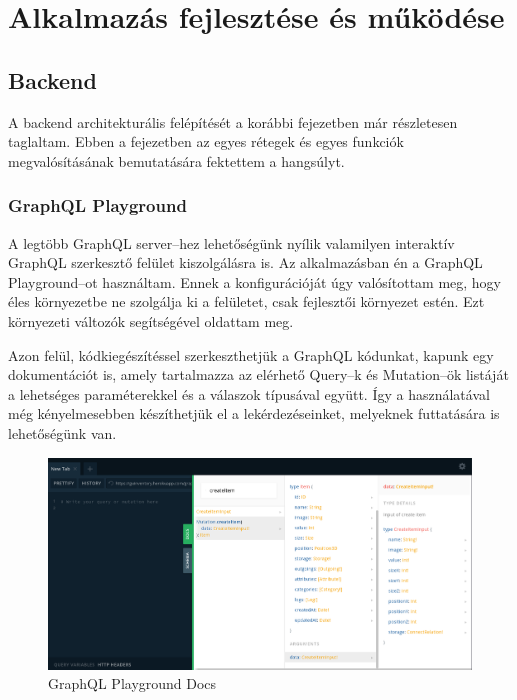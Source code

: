 \chapter{Alkalmazás fejlesztése és működése}

\section{Backend}
A backend architekturális felépítését a korábbi fejezetben már részletesen taglaltam.  
Ebben a fejezetben az egyes rétegek és egyes funkciók megvalósításának bemutatására fektettem a hangsúlyt.

\subsection{GraphQL Playground}
A legtöbb GraphQL server–hez lehetőségünk nyílik valamilyen interaktív GraphQL szerkesztő felület kiszolgálásra is.
Az alkalmazásban én a GraphQL Playground–ot használtam. Ennek a konfigurációját úgy valósítottam meg, hogy éles környezetbe ne szolgálja ki a felületet, csak fejlesztői környezet estén.
Ezt környezeti változók segítségével oldattam meg.

Azon felül, kódkiegészítéssel szerkeszthetjük a GraphQL kódunkat, kapunk egy dokumentációt is, amely tartalmazza az elérhető Query–k és Mutation–ök listáját a lehetséges paraméterekkel és a válaszok típusával együtt.
Így a használatával még kényelmesebben készíthetjük el a lekérdezéseinket, melyeknek futtatására is lehetőségünk van.

\begin{figure}[!ht]
  \centering
  \includegraphics[width=150mm, keepaspectratio]{figures/playground_docs.png}
  \caption{GraphQL Playground Docs}
  \label{fig:playgroundDocs}
\end{figure}

